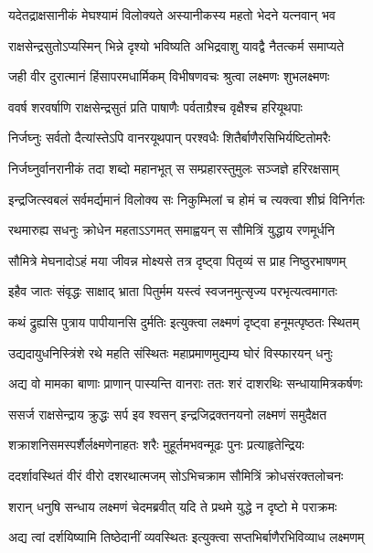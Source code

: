 \twolineshloka
{यदेतद्राक्षसानीकं मेघश्यामं विलोक्यते}
{अस्यानीकस्य महतो भेदने यत्नवान् भव} %

\twolineshloka
{राक्षसेन्द्रसुतोऽप्यस्मिन् भिन्ने दृश्यो भविष्यति}
{अभिद्रवाशु यावद्वै नैतत्कर्म समाप्यते} %

\twolineshloka
{जही वीर दुरात्मानं हिंसापरमधार्मिकम्}
{विभीषणवचः श्रुत्वा लक्ष्मणः शुभलक्ष्मणः} %

\twolineshloka
{ववर्ष शरवर्षाणि राक्षसेन्द्रसुतं प्रति}
{पाषाणैः पर्वताग्रैश्च वृक्षैश्च हरियूथपाः} %

\twolineshloka
{निर्जघ्नुः सर्वतो दैत्यांस्तेऽपि वानरयूथपान्}
{परश्वधैः शितैर्बाणैरसिभिर्यष्टितोमरैः} %

\twolineshloka
{निर्जघ्नुर्वानरानीकं तदा शब्दो महानभूत्}
{स सम्प्रहारस्तुमुलः सञ्जज्ञे हरिरक्षसाम्} %

\twolineshloka
{इन्द्रजित्स्वबलं सर्वमर्द्यमानं विलोक्य सः}
{निकुम्भिलां च होमं च त्यक्त्वा शीघ्रं विनिर्गतः} %

\twolineshloka
{रथमारुह्य सधनुः क्रोधेन महताऽऽगमत्}
{समाह्वयन् स सौमित्रिं युद्धाय रणमूर्धनि} %

\twolineshloka
{सौमित्रे मेघनादोऽहं मया जीवन्न मोक्ष्यसे}
{तत्र दृष्ट्वा पितृव्यं स प्राह निष्ठुरभाषणम्} %

\twolineshloka
{इहैव जातः संवृद्धः साक्षाद् भ्राता पितुर्मम}
{यस्त्वं स्वजनमुत्सृज्य परभृत्यत्वमागतः} %

\twolineshloka
{कथं द्रुह्यसि पुत्राय पापीयानसि दुर्मतिः}
{इत्युक्त्वा लक्ष्मणं दृष्ट्वा हनूमत्पृष्ठतः स्थितम्} %

\twolineshloka
{उद्यदायुधनिस्त्रिंशे रथे महति संस्थितः}
{महाप्रमाणमुद्यम्य घोरं विस्फारयन् धनुः} %

\twolineshloka
{अद्य वो मामका बाणाः प्राणान् पास्यन्ति वानराः}
{ततः शरं दाशरथिः सन्धायामित्रकर्षणः} %

\twolineshloka
{ससर्ज राक्षसेन्द्राय क्रुद्धः सर्प इव श्वसन्}
{इन्द्रजिद्रक्तनयनो लक्ष्मणं समुदैक्षत} %

\twolineshloka
{शक्राशनिसमस्पर्शैर्लक्ष्मणेनाहतः शरैः}
{मुहूर्तमभवन्मूढः पुनः प्रत्याहृतेन्द्रियः} %

\twolineshloka
{ददर्शावस्थितं वीरं वीरो दशरथात्मजम्}
{सोऽभिचक्राम सौमित्रिं क्रोधसंरक्तलोचनः} %

\twolineshloka
{शरान् धनुषि सन्धाय लक्ष्मणं चेदमब्रवीत्}
{यदि ते प्रथमे युद्धे न दृष्टो मे पराक्रमः} %

\twolineshloka
{अद्य त्वां दर्शयिष्यामि तिष्ठेदानीं व्यवस्थितः}
{इत्युक्त्वा सप्तभिर्बाणैरभिविव्याध लक्ष्मणम्} %

